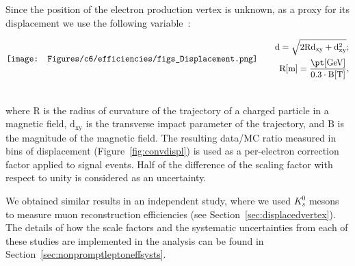 Since the position of the \displ electron production vertex is
unknown, as a proxy for its displacement we use the following
variable~\cite{convz}:

\begin{align}
\vcenter{\hbox{\texttt{[image: Figures/c6/efficiencies/figs\_Displacement.png]}}}
&\qquad
\begin{aligned}
\mathrm{d = \sqrt{2Rd_{xy}+d_{xy}^2}};
\\
\mathrm{R [m] = \frac{\pt [GeV]}{0.3 \cdot B [T]}},
\end{aligned}\\
\vcenter{\hbox{\begin{minipage}{4cm}
\end{minipage}}}
& \notag
\end{align}

\noindent where $\mathrm{R}$ is the radius of curvature of the trajectory of
a charged particle in a magnetic field, $\mathrm{d_{xy}}$ is the
transverse impact parameter of the trajectory, and $\mathrm{B}$ is the
magnitude of the magnetic field. The resulting data/MC ratio measured in bins of displacement
(Figure~\ref{fig:convdispl}) is used as a per-electron correction
factor applied to signal events. Half of the difference of the
scaling factor with respect to unity is considered as an uncertainty.

We obtained similar results in an independent study, where we used $K_s^0$
mesons
to measure \displ muon reconstruction efficiencies (see Section~\ref{sec:displacedvertex}).
The details of how the scale factors and the systematic uncertainties
from each of these studies are implemented in the analysis can be found in Section~\ref{sec:nonpromptleptoneffsysts}.

